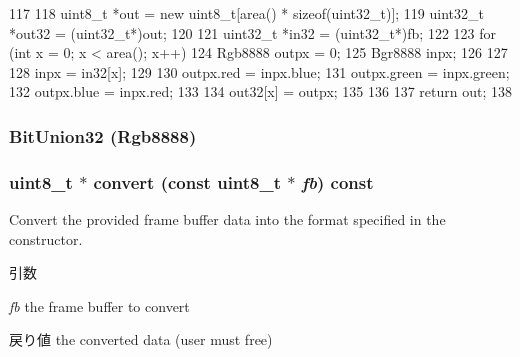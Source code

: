 \begin{DoxyCode}
117 {
118     uint8_t *out = new uint8_t[area() * sizeof(uint32_t)];
119     uint32_t *out32 = (uint32_t*)out;
120 
121     uint32_t *in32 = (uint32_t*)fb;
122 
123     for (int x = 0; x < area(); x++) {
124         Rgb8888 outpx = 0;
125         Bgr8888 inpx;
126 
127 
128         inpx = in32[x];
129 
130         outpx.red = inpx.blue;
131         outpx.green = inpx.green;
132         outpx.blue = inpx.red;
133 
134         out32[x] = outpx;
135     }
136 
137     return out;
138 }
\end{DoxyCode}
\hypertarget{classVideoConvert_aefe4fbfd52e592e91aee05d5814ce23b}{
\subsubsection[{BitUnion32}]{\setlength{\rightskip}{0pt plus 5cm}BitUnion32 (Rgb8888)}}
\label{classVideoConvert_aefe4fbfd52e592e91aee05d5814ce23b}
\hypertarget{classVideoConvert_a9d6b4342acae62e284ca3a200af30554}{
\subsubsection[{convert}]{\setlength{\rightskip}{0pt plus 5cm}uint8\_\-t $\ast$ convert (const uint8\_\-t $\ast$ {\em fb}) const}}
\label{classVideoConvert_a9d6b4342acae62e284ca3a200af30554}
Convert the provided frame buffer data into the format specified in the constructor. 
\begin{DoxyParams}{引数}
\item[{\em fb}]the frame buffer to convert \end{DoxyParams}
\begin{DoxyReturn}{戻り値}
the converted data (user must free) 
\end{DoxyReturn}




